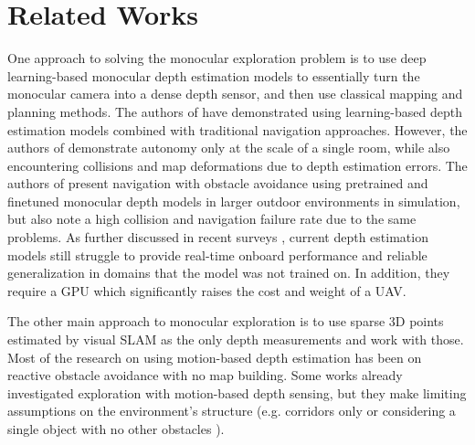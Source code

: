 \documentclass[letterpaper, 10 pt, journal, twoside]{IEEEtran}
\begin{document}
\section{Related Works}
\label{sec:related_works}

{One approach to solving the monocular exploration problem is to use deep learning-based monocular depth estimation models to essentially turn the monocular camera into a dense depth sensor, and then use classical mapping and planning methods.
The authors of \cite{simon2023mononav, cnn_explo_singleroom} have demonstrated using learning-based depth estimation models combined with traditional navigation approaches.
However, the authors of \cite{simon2023mononav} demonstrate autonomy only at the scale of a single room, while also encountering collisions and map deformations due to depth estimation errors.
The authors of \cite{mono_airsim_nav_2025} present navigation with obstacle avoidance using pretrained and finetuned monocular depth models in larger outdoor environments in simulation, but also note a high collision and navigation failure rate due to the same problems.
As further discussed in recent surveys \cite{deep_mono_depth_2021, monodepth_survey_big_2024}, current depth estimation models still struggle to provide real-time onboard performance and reliable generalization in domains that the model was not trained on.
In addition, they require a GPU which significantly raises the cost and weight of a UAV.

The other main approach to monocular exploration is to use sparse 3D points estimated by visual SLAM as the only depth measurements and work with those.
Most of the research on using motion-based depth estimation has been on reactive obstacle avoidance \cite{flame, avoidance_mono1} with no map building.
Some works already investigated exploration with motion-based depth sensing, but they make limiting assumptions on the environment's structure (e.g. corridors only \cite{corridors_mono_nav_2009} or considering a single object with no other obstacles \cite{information_driven_bbx_mapping}).

}
\end{document}
